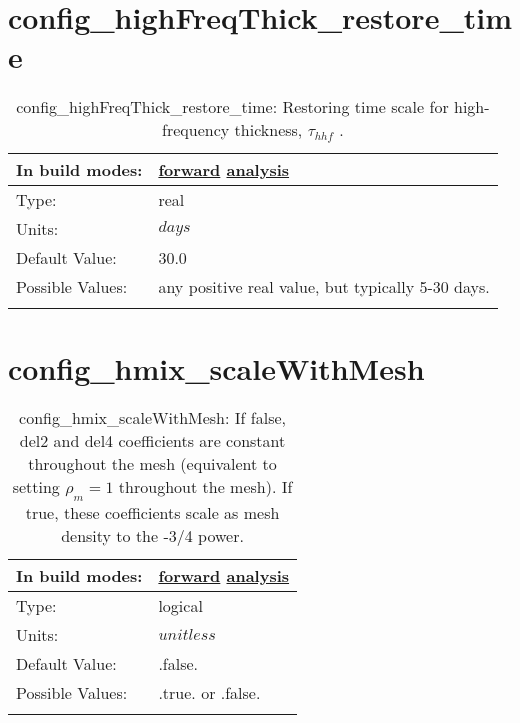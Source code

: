 \section[config\_highFreqThick\_restore\_time]{config\_highFreqThick\_restore\_time}
\label{sec:nm_sec_config_highFreqThick_restore_time}
\begin{center}
\begin{longtable}{| p{2.0in} || p{4.0in} |}
    \hline
    In build modes: & \hyperref[subsec:forward_nm_tab_ALE_frequency_filtered_thickness]{forward} \hyperref[subsec:analysis_nm_tab_ALE_frequency_filtered_thickness]{analysis} \\
    \hline
    Type: & real \\
    \hline
    Units: & $days$ \\
    \hline
    Default Value: & 30.0 \\
    \hline
    Possible Values: & any positive real value, but typically 5-30 days. \\
    \hline
    \caption{config\_highFreqThick\_restore\_time:  Restoring time scale for high-frequency thickness,  $\tau_{hhf}$ .}
\end{longtable}
\end{center}
\section[config\_hmix\_scaleWithMesh]{config\_hmix\_scaleWithMesh}
\label{sec:nm_sec_config_hmix_scaleWithMesh}
\begin{center}
\begin{longtable}{| p{2.0in} || p{4.0in} |}
    \hline
    In build modes: & \hyperref[subsec:forward_nm_tab_hmix]{forward} \hyperref[subsec:analysis_nm_tab_hmix]{analysis} \\
    \hline
    Type: & logical \\
    \hline
    Units: & $unitless$ \\
    \hline
    Default Value: & .false. \\
    \hline
    Possible Values: & .true. or .false. \\
    \hline
    \caption{config\_hmix\_scaleWithMesh:  If false, del2 and del4 coefficients are constant throughout the mesh (equivalent to setting  $\rho_m=1$  throughout the mesh).  If true, these coefficients scale as mesh density to the -3/4 power.}
\end{longtable}
\end{center}
